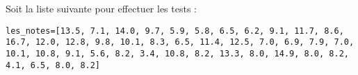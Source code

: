 \def\xxnumchapitre{Chapitre 1 \vspace{.2cm}}
\def\xxchapitre{\hspace{.12cm} Découverte de l'algorithmique et de la programmation}

\def\xxcompetences{%
\textsl{%
\textbf{Savoirs et compétences :}\\
\vspace{-.4cm}
\begin{itemize}[label=\ding{112},font=\color{bleuxp}] 
\item .
\end{itemize}
}}


\def\xxfigures{
}%

\def\xxtitreexo{Structures algorithmiques}
\def\xxsourceexo{Lien Capytale \url{https://capytale2.ac-paris.fr/web/c/f807-628160/mcer}}
\def\xxactivite{TP 03 \ifprof  -- Corrigé \else \fi}


%

\setlength{\columnseprule}{.1pt}

\pagestyle{fancy}
\thispagestyle{plain}

\vspace{4.5cm}

\def\columnseprulecolor{\color{bleuxp}}
\setlength{\columnseprule}{0.4pt} 





\ifprof
\vspace{1cm}
\else
\fi



Soit la liste suivante pour effectuer les tests : 
\begin{lstlisting}
les_notes=[13.5, 7.1, 14.0, 9.7, 5.9, 5.8, 6.5, 6.2, 9.1, 11.7, 8.6, 16.7, 12.0, 12.8, 9.8, 10.1, 8.3, 6.5, 11.4, 12.5, 7.0, 6.9, 7.9, 7.0, 10.1, 10.8, 9.1, 5.6, 8.2, 3.4, 10.8, 8.2, 13.3, 8.0, 14.9, 8.0, 8.2, 4.1, 6.5, 8.0, 8.2]
\end{lstlisting}

